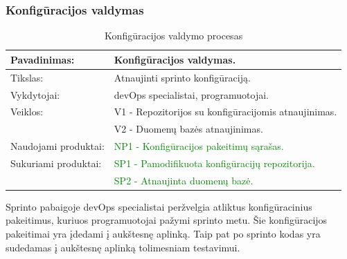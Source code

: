 \documentclass{VUMIFPSkursinis}
\begin{document}
	\subsubsection{Konfigūracijos valdymas}
	\begin{center}
		\begin{table}[ht]
			\caption{Konfigūracijos valdymo procesas}
			\begin{tabular}{ | l | l | }
				\hline
				Pavadinimas:		& Konfigūracijos valdymas.				\\ \hline
				Tikslas: 		& Atnaujinti sprinto konfigūraciją.			\\ \hline
				Vykdytojai:		& devOps specialistai, programuotojai.			\\ \hline
				Veiklos:		& V1 - Repozitorijos su konfigūracijomis atnaujinimas.	\\
							& V2 - Duomenų bazės atnaujinimas.			\\ \hline
				Naudojami produktai:	& \textcolor{green}{NP1 - Konfigūracijos pakeitimų sąrašas.	}	\\ \hline
				Sukuriami produktai:	& \textcolor{green}{SP1 - Pamodifikuota konfigūracijų repozitorija. }	\\
							& \textcolor{green}{SP2 - Atnaujinta duomenų bazė. }			\\ \hline
			\end{tabular}
		\end{table}
	\end{center}
		Sprinto pabaigoje devOps specialistai peržvelgia atliktus konfigūracinius pakeitimus, kuriuos programuotojai pažymi sprinto metu.
		Šie konfigūracijos pakeitimai yra įdedami į aukštesnę aplinką. Taip pat po sprinto kodas yra sudedamas į aukštesnę aplinką tolimesniam testavimui.
\end{document}
